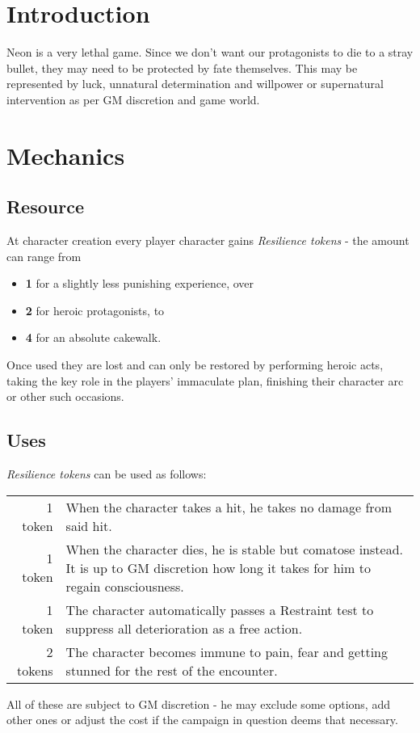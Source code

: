 \documentclass[12pt,a4paper,openany,usenames,dvipsnames]{book}
\begin{document}
	

	\chapter{Introduction}
	Neon is a very lethal game. Since we don't want our protagonists to die to a stray bullet, they may need to be protected by fate themselves. 
	This may be represented by luck, unnatural determination and willpower or supernatural intervention as per GM discretion and game world.

	\chapter{Mechanics}
	\section{Resource}
	At character creation every player character gains \emph{Resilience tokens} - the amount can range from
	\begin{itemize}
		\item \textbf{1} for a slightly less punishing experience, over
		\item \textbf{2} for heroic protagonists, to
		\item \textbf{4} for an absolute cakewalk.
	\end{itemize}
	Once used they are lost and can only be restored by performing heroic acts, taking the key role in the players' immaculate plan, finishing their character arc or other such occasions.

	\pagebreak
	\section{Uses}
	\emph{Resilience tokens} can be used as follows:
	\par
	\begin{tabularx}{\columnwidth}{rX}
		1 token & When the character takes a hit, he takes no damage from said hit. \\
		1 token & When the character dies, he is stable but comatose instead. It is up to GM discretion how long it takes for him to regain consciousness. \\
		1 token & The character automatically passes a Restraint test to suppress all deterioration as a free action. \\
		2 tokens & The character becomes immune to pain, fear and getting stunned for the rest of the encounter.
	\end{tabularx}
	\par
	All of these are subject to GM discretion - he may exclude some options, add other ones or adjust the cost if the campaign in question deems that necessary.
\end{document}
